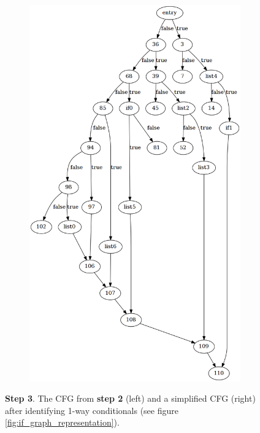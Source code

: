 \begin{figure}[htbp]
\begin{subfigure}[ht]{0.45\textwidth}
		\includegraphics[width=\textwidth]{inc/appendices/control_flow_analysis_example/stmt_3.png}
	\end{subfigure}
	\caption{\textbf{Step 3}. The CFG from \textbf{step 2} (left) and a simplified CFG (right) after identifying 1-way conditionals (see figure \ref{fig:if_graph_representation}).}
	\label{fig:step_3}
\end{figure}

